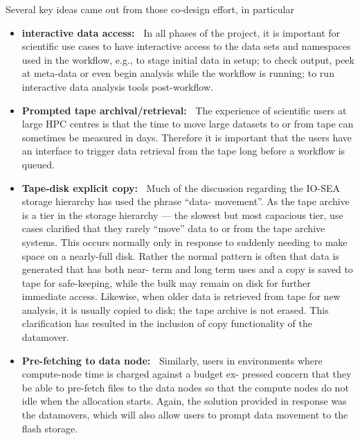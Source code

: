 Several key ideas came out from those co-design effort, in particular
\begin{itemize}
    \item \textbf{interactive data access:~} In all phases of the project, it is important for scientific use
    cases to have interactive access to the data sets and namespaces used in the workflow, e.g., to stage initial
    data in setup; to check output, peek at meta-data or even begin analysis while the workflow is running; to
    run interactive data analysis tools post-workflow.
    
    \item \textbf{Prompted tape archival/retrieval:~} The experience of scientific users at large HPC centres is
    that the time to move large datasets to or from tape can sometimes be measured in days. Therefore it is
    important that the users have an interface to trigger data retrieval from the tape long before a workflow is
    queued.
    
    \item \textbf{Tape-disk explicit copy:~} Much of the discussion regarding the IO-SEA storage hierarchy has
    used the phrase “data- movement”. As the tape archive is a tier in the storage hierarchy — the slowest but
    most capacious tier, use cases clarified that they rarely “move” data to or from the tape archive systems.
    This occurs normally only in response to suddenly needing to make space on a nearly-full disk. Rather the
    normal pattern is often that data is generated that has both near- term and long term uses and a copy is
    saved to tape for safe-keeping, while the bulk may remain on disk for further immediate access. Likewise,
    when older data is retrieved from tape for new analysis, it is usually copied to disk; the tape archive is
    not erased. This clarification has resulted in the inclusion of copy functionality of the datamover.
    
    \item \textbf{Pre-fetching to data node:~} Similarly, users in environments where compute-node time is
    charged against a budget ex- pressed concern that they be able to pre-fetch files to the data nodes so that
    the compute nodes do not idle when the allocation starts. Again, the solution provided in response was the
    datamovers, which will also allow users to prompt data movement to the flash storage. 
    

\end{itemize}
